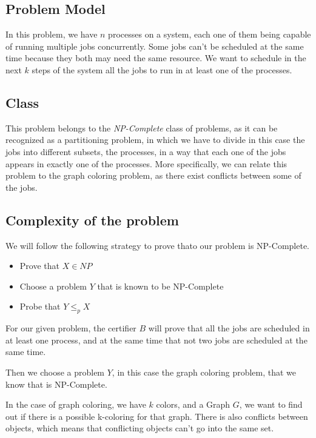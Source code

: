\documentclass{article}
\begin{document}
\subsection*{Problem Model}

In this problem, we have $n$ processes on a system, each one of them being capable of running multiple jobs concurrently. Some jobs can't be scheduled at the same time because they both may need the same resource. We want to schedule in the next $k$ steps of the system all the jobs to run in at least one of the processes.

\subsection*{Class}

This problem belongs to the \textit{NP-Complete} class of problems, as it can be recognized as a partitioning problem, in which we have to divide in this case the jobs into different subsets, the processes, in a way that each one of the jobs appears in exactly one of the processes. More specifically, we can relate this problem to the graph coloring problem, as there exist conflicts between some of the jobs.

\subsection*{Complexity of the problem}

We will follow the following strategy to prove thato our problem is NP-Complete.

\begin{itemize}
 \item Prove that $X\in NP$
 \item Choose a problem $Y$ that is known to be NP-Complete
 \item Probe that $Y\leq_p X$
\end{itemize}

For our given problem, the certifier $B$ will prove that all the jobs are scheduled in at least one process, and at the same time that not two jobs are scheduled at the same time.

Then we choose a problem $Y$, in this case the graph coloring problem, that we know that is NP-Complete.

In the case of graph coloring, we have $k$ colors, and a Graph $G$, we want to find out if there is a possible k-coloring for that graph. There is also conflicts between objects, which means that conflicting objects can't go into the same set.
\end{document}
